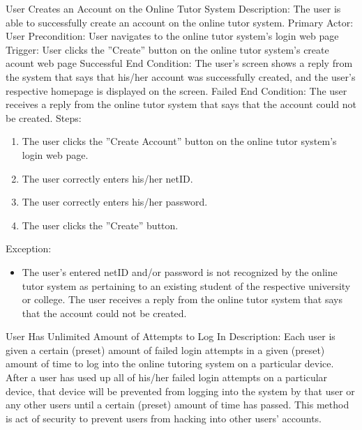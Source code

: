     \begin{section}{User Creates an Account on the Online Tutor System}
        Description: The user is able to successfully create an account on the online tutor system. \newline
        Primary Actor: User \newline
        Precondition: User navigates to the online tutor system's login web page \newline
        Trigger: User clicks the ''Create'' button on the online tutor system's create acount web page \newline
        Successful End Condition: The user's screen shows a reply from the system that says that his/her account was 
        successfully created, and the user's respective homepage is displayed on the screen. \newline
        Failed End Condition: The user receives a reply from the online tutor system that says that the account could not be created. \newline
         \newline
        Steps:
        \begin{enumerate}
            \item{The user clicks the ''Create Account'' button on the online tutor system's login web page.}
            \item{The user correctly enters his/her netID.}
            \item{The user correctly enters his/her password.}
            \item{The user clicks the ''Create'' button.}
        \end{enumerate}
        Exception:
        \begin{itemize}
            \item{The user's entered netID and/or password is not recognized by the online tutor system as pertaining to an existing student of the respective university or college. 
            The user receives a reply from the online tutor system that says that the account could not be created.}
        \end{itemize}
\end{section}
    
    \begin{section}{User Has Unlimited Amount of Attempts to Log In}
        Description: Each user is given a certain (preset) amount of failed login attempts 
        in a given (preset) amount of time to log into the online tutoring system on a particular device.  
        After a user has used up all of his/her failed login attempts on a particular device, 
        that device will be prevented from logging into the system by that user or any other users 
        until a certain (preset) amount of time has passed.  This method is act of security to prevent 
        users from hacking into other users' accounts.
    \end{section}









